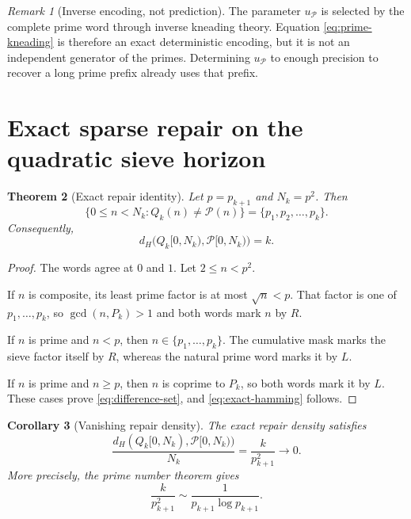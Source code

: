 \documentclass[11pt]{article}
\newtheorem{theorem}{Theorem}[section]
\newtheorem{corollary}[theorem]{Corollary}
\theoremstyle{definition}
\theoremstyle{remark}
\newtheorem{remark}[theorem]{Remark}
\newcommand{\cP}{\mathcal{P}}
\newcommand{\uP}{u_{\mathcal P}}
\begin{document}
\begin{remark}[Inverse encoding, not prediction]\label{rem:inverse}
The parameter $\uP$ is selected by the complete prime word through inverse kneading theory.  Equation \eqref{eq:prime-kneading} is therefore an exact deterministic encoding, but it is not an independent generator of the primes.  Determining $\uP$ to enough precision to recover a long prime prefix already uses that prefix.
\end{remark}

\section{Exact sparse repair on the quadratic sieve horizon}

\begin{theorem}[Exact repair identity]\label{thm:exact-repair}
Let $p=p_{k+1}$ and $N_k=p^2$.  Then
\begin{equation}\label{eq:difference-set}
    \{0\le n<N_k:Q_k(n)\ne\cP(n)\}
    =\{p_1,p_2,\ldots,p_k\}.
\end{equation}
Consequently,
\begin{equation}\label{eq:exact-hamming}
    d_H\bigl(Q_k[0,N_k),\cP[0,N_k)\bigr)=k.
\end{equation}
\end{theorem}

\begin{proof}
The words agree at $0$ and $1$.  Let $2\le n<p^2$.

If $n$ is composite, its least prime factor is at most $\sqrt n<p$.  That factor is one of $p_1,\ldots,p_k$, so $\gcd(n,P_k)>1$ and both words mark $n$ by $R$.

If $n$ is prime and $n<p$, then $n\in\{p_1,\ldots,p_k\}$.  The cumulative mask marks the sieve factor itself by $R$, whereas the natural prime word marks it by $L$.

If $n$ is prime and $n\ge p$, then $n$ is coprime to $P_k$, so both words mark it by $L$.  These cases prove \eqref{eq:difference-set}, and \eqref{eq:exact-hamming} follows.
\end{proof}

\begin{corollary}[Vanishing repair density]\label{cor:repair-density}
The exact repair density satisfies
\begin{equation}\label{eq:repair-rate}
    \frac{d_H(Q_k[0,N_k),\cP[0,N_k))}{N_k}
    =\frac{k}{p_{k+1}^2}\longrightarrow 0.
\end{equation}
More precisely, the prime number theorem gives
\begin{equation}\label{eq:repair-pnt}
    \frac{k}{p_{k+1}^2}
    \sim\frac{1}{p_{k+1}\log p_{k+1}}.
\end{equation}
\end{corollary}
\end{document}
